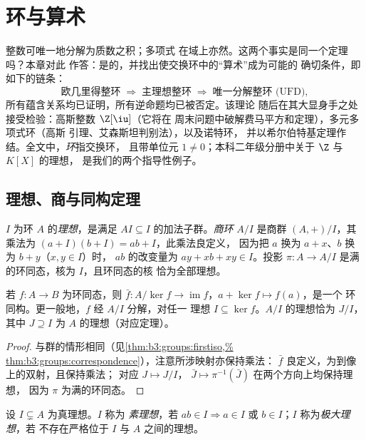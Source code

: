 \chapter{环与算术}\label{ch:b3:rings}

整数可唯一地分解为质数之积；多项式
在域上亦然。这两个事实是同一个定理吗？本章对此
作答：是的，并找出使交换环中的“算术”成为可能的
确切条件，即如下的链条：
\[
\text{欧几里得整环} \;\Longrightarrow\; \text{主理想整环}
\;\Longrightarrow\; \text{唯一分解整环 (UFD)},
\]
所有蕴含关系均已证明，所有逆命题均已被否定。该理论
随后在其大显身手之处接受检验：高斯整数
$\Z[\iu]$（它将在
周末问题中破解费马平方和定理），多元多项式环（高斯
引理、艾森斯坦判别法），以及诺特环，
并以希尔伯特基定理作结。全文中，\emph{环}指交换环，
且带单位元 $1 \neq 0$；本科二年级分册中关于 $\Z$ 与 $K[X]$ 的理想，
是我们的两个指导性例子。

\section{理想、商与同构定理}

\begin{definition}\label{def:b3:rings:ideal}
$I$ 为环 $A$ 的\emph{理想}，是满足
$AI \subseteq I$ 的加法子群。\emph{商环} $A/I$ 是商群
$(A, +)/I$，其乘法为
$(a + I)(b + I) = ab + I$，此乘法良定义，
因为把 $a$ 换为 $a + x$、$b$ 换为 $b + y$（$x, y \in I$）时，
$ab$ 的改变量为 $ay + xb + xy \in I$。投影 $\pi \colon A
\to A/I$ 是满的环同态，核为 $I$，且环同态的核
恰为全部理想。
\end{definition}

\begin{theorem}[第一同构定理]\label{thm:b3:rings:firstiso}
若 $f \colon A \to B$ 为环同态，则 $\bar f\colon
A/\ker f \to \operatorname{im} f$，$a + \ker f \mapsto f(a)$，是一个
环同构。更一般地，$f$ 经 $A/I$ 分解，对任一
理想 $I \subseteq \ker f$。$A/I$ 的理想恰为
$J/I$，其中 $J \supseteq I$ 为 $A$ 的理想（对应定理）。
\end{theorem}

\begin{proof}
与群的情形相同（见\cref{thm:b3:groups:firstiso,%
thm:b3:groups:correspondence}），注意所涉映射亦保持乘法：
$\bar f$ 良定义，为到像上的双射，且保持乘法；
对应 $J \mapsto J/I$，
$\bar J \mapsto \pi^{-1}(\bar J)$ 在两个方向上均保持理想，
因为 $\pi$ 为满的环同态。
\end{proof}

\begin{definition}\label{def:b3:rings:primemaximal}
设 $I \subsetneq A$ 为真理想。$I$ 称为
\emph{素理想}，若 $ab \in I \Rightarrow a \in I$
或 $b \in I$；$I$ 称为\emph{极大理想}，若
不存在严格位于 $I$ 与 $A$ 之间的理想。
\end{definition}

